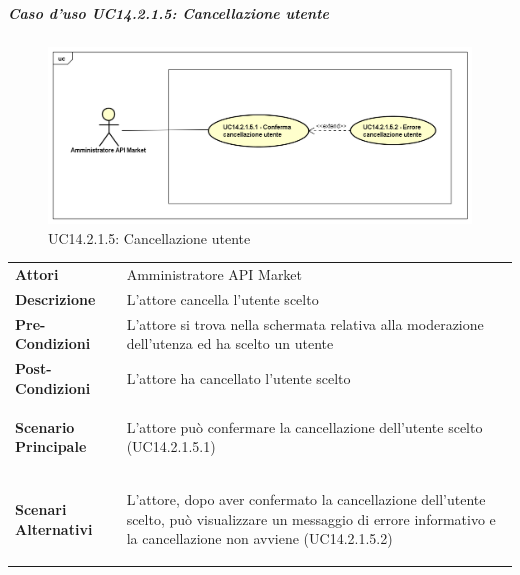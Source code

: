 \newpage
\subparagraph{Caso d'uso UC14.2.1.5: Cancellazione utente}
\label{UC14_2_1_5}
\begin{figure}[ht]
	\centering
	\includegraphics[scale=0.45]{UML/UC14_2_1_5.png}
	\caption{UC14.2.1.5: Cancellazione utente}
\end{figure}

\begin{minipage}{\linewidth}
	\begin{tabular}{ l | p{11cm}}
		\hline
		\rowcolor{Gray}
		\multicolumn{2}{c}{UC14.2.1.5 - Cancellazione utente} \\
		\hline
		\textbf{Attori} & Amministratore API Market \\
		\textbf{Descrizione} & L'attore cancella l'utente scelto \\
		\textbf{Pre-Condizioni} & L'attore si trova nella schermata relativa alla moderazione dell'utenza ed ha scelto un utente \\
		\textbf{Post-Condizioni} & L'attore ha cancellato l'utente scelto \\
		\textbf{Scenario Principale} & 
		\begin{enumerate*}[label=(\arabic*.),itemjoin={\newline}]
			\item L'attore può confermare la cancellazione dell'utente scelto (UC14.2.1.5.1)
		\end{enumerate*}\\
		\textbf{Scenari Alternativi} & 
		\begin{enumerate*}[label=(\arabic*.),itemjoin={\newline}]
			\item L'attore, dopo aver confermato la cancellazione dell'utente scelto, può visualizzare un messaggio di errore informativo e la cancellazione non avviene (UC14.2.1.5.2)
		\end{enumerate*}\\
	\end{tabular}
\end{minipage}


